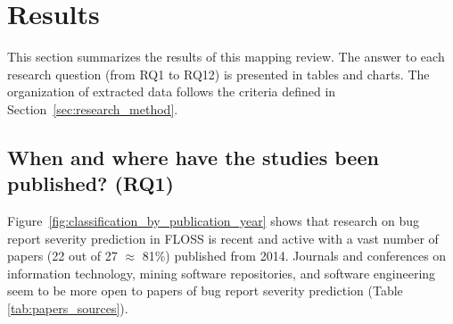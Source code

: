 \section{Results}  \label{sec:results}
This section summarizes the results of this mapping review. The answer to each research question (from RQ1 to RQ12) is presented in tables and charts. The organization of extracted data follows the criteria defined in Section~\ref{sec:research_method}. 

\subsection{When and where have the studies been published? (RQ1)}\label{subsec:rq1}

Figure~\ref{fig:classification_by_publication_year} shows that research on bug report severity prediction in FLOSS is recent and active with a vast number of papers (22 out of 27 $\approx$ 81\%) published from 2014. Journals and conferences on information technology, mining software repositories, and software engineering seem to be more open to papers of bug report severity prediction (Table \ref{tab:papers_sources}). 

